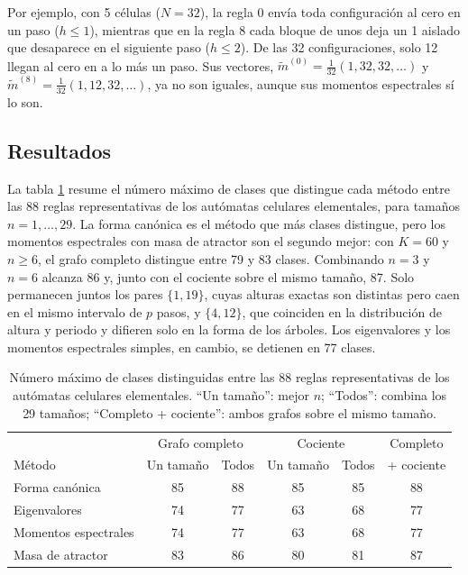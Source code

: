 Por ejemplo, con 5 células ($N = 32$), la regla 0 envía toda configuración al cero en un paso ($h \le 1$), mientras que en la regla 8 cada bloque de unos deja un 1 aislado que desaparece en el siguiente paso ($h \le 2$). De las 32 configuraciones, solo 12 llegan al cero en a lo más un paso. Sus vectores, $\tilde{m}^{(0)} = \frac{1}{32}(1, 32, 32, \dots)$ y $\tilde{m}^{(8)} = \frac{1}{32}(1, 12, 32, \dots)$, ya no son iguales, aunque sus momentos espectrales sí lo son.

\subsection{Resultados}

La tabla \ref{tab:clases-metodos} resume el número máximo de clases que distingue cada método entre las 88 reglas representativas de los autómatas celulares elementales, para tamaños $n = 1, \dots, 29$. La forma canónica es el método que más clases distingue, pero los momentos espectrales con masa de atractor son el segundo mejor: con $K = 60$ y $n \ge 6$, el grafo completo distingue entre 79 y 83 clases. Combinando $n = 3$ y $n = 6$ alcanza 86 y, junto con el cociente sobre el mismo tamaño, 87. Solo permanecen juntos los pares $\{1, 19\}$, cuyas alturas exactas son distintas pero caen en el mismo intervalo de $p$ pasos, y $\{4, 12\}$, que coinciden en la distribución de altura y periodo y difieren solo en la forma de los árboles. Los eigenvalores y los momentos espectrales simples, en cambio, se detienen en 77 clases.

\begin{table}[htbp]
	\centering
	\caption{Número máximo de clases distinguidas entre las 88 reglas representativas de los autómatas celulares elementales. ``Un tamaño'': mejor $n$; ``Todos'': combina los 29 tamaños; ``Completo + cociente'': ambos grafos sobre el mismo tamaño.}
	\label{tab:clases-metodos}
	\small
	\setlength{\tabcolsep}{4pt}
	\begin{tabular}{lccccc}
		\hline
		& \multicolumn{2}{c}{Grafo completo} & \multicolumn{2}{c}{Cociente} & Completo \\
		Método & Un tamaño & Todos & Un tamaño & Todos & + cociente \\
		\hline
		Forma canónica        & 85 & 88 & 85 & 85 & 88 \\
		Eigenvalores          & 74 & 77 & 63 & 68 & 77 \\
		Momentos espectrales  & 74 & 77 & 63 & 68 & 77 \\
		Masa de atractor      & 83 & 86 & 80 & 81 & 87 \\
		\hline
	\end{tabular}
\end{table}

